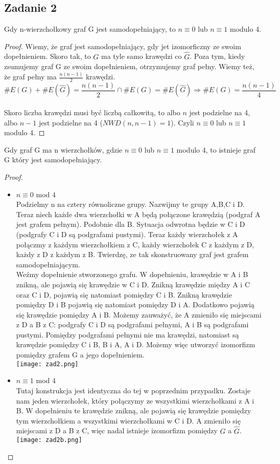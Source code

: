 \documentclass[a4paper]{article}
\begin{document}
\subsection*{Zadanie 2}
Gdy n-wierzchołkowy graf G jest samodopełniający, to $n\equiv 0$ lub $n \equiv 1$ modulo 4.
\begin{proof}
Wiemy, że graf jest samodopełniający, gdy jet izomorficzny ze swoim dopełnieniem. Skoro tak, to $G$ ma tyle samo krawędzi co $\widehat{G}$. Poza tym, kiedy zsumujemy graf G ze swoim dopełnieniem, otrzymujemy graf pełny. Wiemy też, że graf pełny ma $\frac{n(n-1)}{2}$ krawędzi.\\
$$\# E(G)+\# E(\widehat{G})=\frac{n(n-1)}{2} \cap \# E(G)=\# E(\widehat{G}) \Rightarrow \# E(G)=\frac{n(n-1)}{4}$$\\
Skoro liczba krawędzi musi być liczbą całkowitą, to albo $n$ jest podzielne na 4, albo $n-1$ jest podzielne na 4 ($NWD(n,n-1)=1$). Czyli $n\equiv 0$ lub $n \equiv 1$ modulo 4.
\end{proof}
\clearpage
Gdy graf G ma n wierzchołków, gdzie $n\equiv 0$ lub $n \equiv 1$ modulo 4, to istnieje graf G który jest samodopełniający.
\begin{proof}
\begin{itemize}
\item $n\equiv 0$ mod $4$\\
Podzielmy n na cztery równoliczne grupy. Nazwijmy te grupy A,B,C i D. Teraz niech każde dwa wierzchołki w A będą połączone krawędzią (podgraf A jest grafem pełnym). Podobnie dla B. Sytuacja odwrotna będzie w C i D (podgrafy C i D są podgrafami pustymi). Teraz każdy wierzchołek z A połączmy z każdym wierzchołkiem z C, każdy wierzchołek C z każdym z D, każdy z D z każdym z B. Twierdzę, ze tak skonstruowany graf jest grafem samodopełniającym.\\
Weźmy dopełnienie stworzonego grafu. W dopełnieniu, krawędzie w A i B znikną, ale pojawią się krawędzie w C i D. Znikną krawędzie między A i C oraz C i D, pojawią się natomiast pomiędzy C i B. Znikną krawędzie pomiędzy D i B pojawią się natomiast pomiędzy D i A. Dodatkowo pojawią się krawędzie pomiędzy A i B. Możemy zauważyć, że A zmieniło się miejscami z D a B z C: podgrafy C i D są podgrafami pełnymi, A i B są podgrafami pustymi. Pomiędzy podgrafami pełnymi nie ma krawędzi, natomiast są krawędzie pomiędzy C i B, B i A, A i D. Możemy więc utworzyć izomorfizm pomiędzy grafem G a jego dopełnieniem.\\
\texttt{[image: zad2.png]}
\item $n\equiv 1$ mod $4$\\
Tutaj konstrukcja jest identyczna do tej w poprzednim przypadku. Zostaje nam jeden wierzchołek, który połączymy ze wszystkimi wierzchołkami z A i B. W dopełnieniu te krawędzie znikną, ale pojawią się krawędzie pomiędzy tym wierzchołkiem a wszystkimi wierzchołkami w C i D. A zmieniło się miejscami z D a B z C, więc nadal istnieje izomorfizm pomiędzy $G$ a $\widehat{G}$.\\
\texttt{[image: zad2b.png]}
\end{itemize}
\end{proof}
\clearpage
\end{document}
